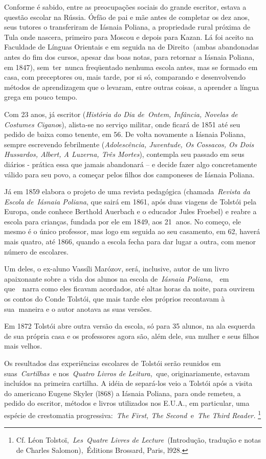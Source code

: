 Conforme é sabido, entre as preocupações sociais do grande escritor,
estava a questão escolar na Rússia. Órfão de pai e mãe antes de
completar os dez anos, seus tutores o transferiram de Iásnaia Poliana, a
propriedade rural próxima de Tula onde nascera, primeiro para Moscou e
depois para Kazan. Lá foi aceito na Faculdade de Línguas Orientais e em
seguida na de Direito\textbf{~}(ambas abandonadas antes do fim dos
cursos, apesar das boas notas, para retornar a Iásnaia Poliana, em
1847), sem~ter~nunca freqüentado nenhuma escola antes, mas se formado em
casa, com preceptores ou, mais tarde, por si só, comparando e
desenvolvendo métodos de aprendizagem que o levaram, entre outras
coisas, a aprender a língua grega em pouco tempo.

Com 23 anos, já escritor (\emph{História do Dia de~Ontem, Infância,
Novelas de Costumes Cigano}s), alista-se no serviço militar, onde ficará
de 1851 até seu pedido de baixa como tenente, em 56. De volta novamente
a Iásnaia Poliana, sempre escrevendo febrilmente (\emph{Adolescência,
Juventude, Os Cossacos, Os Dois Hussardos, Albert, A Luzerna, Três
Mortes}), contempla seu passado em seus diários - prática essa que
jamais abandonará -- e decide fazer algo concretamente válido para seu
povo, a começar pelos filhos dos camponeses de Iásnaia Poliana.~

Já em 1859 elabora o projeto de uma revista pedagógica
(chamada~\emph{Revista da Escola de}~\emph{Iásnaia Poliana}, que sairá
em 1861, após duas viagens de Tolstói pela Europa, onde conhece Berthold
Auerbach e o educador Jules Froebel) e reabre a escola para crianças,
fundada por ele em 1849, aos 21\textbf{~}anos. No começo, ele mesmo é o
único professor, mas logo em seguida ao seu casamento, em 62, haverá
mais quatro, até 1866, quando a escola fecha para dar lugar a outra, com
menor número de escolares.

Um deles, o ex-aluno Vassíli Marózov, será, inclusive, autor de um livro
apaixonante sobre a vida dos alunos na escola de~\emph{Iásnaia
Poliana},~~em que~~narra como eles ficavam acordados, até altas horas da
noite, para ouvirem os contos do Conde Tolstói, que mais tarde eles
próprios recontavam à sua\textbf{~}maneira e o autor anotava as suas
versões.

Em 1872 Tolstói abre outra versão da escola, só para 35 alunos, na ala
esquerda de sua própria casa e os professores agora são, além dele, sua
mulher e seus filhos mais velhos.

Os resultados das experiências escolares de Tolstói serão reunidos em
suas~\emph{Cartilhas~}e nos~\emph{Quatro Livros de Leitura,~}que,
originariamente, estavam incluídos na primeira cartilha. A idéia de
separá-los veio a Tolstói após a visita do americano Eugene Skyler
(l868) a Iásnaia Poliana, para onde remeteu, a pedido do escritor,
métodos e livros utilizados nos E.U.A., em particular, uma espécie de
crestomatia progressiva:~\emph{The First, The Second~}e~\emph{The Third
Reader.} \footnote{Cf. Léon Tolstoï,~\emph{Les}~\emph{Quatre Livres de
  Lecture~}(Introdução, tradução e notas de Charles Salomon),~Éditions
  Brossard, Paris, l928.}

